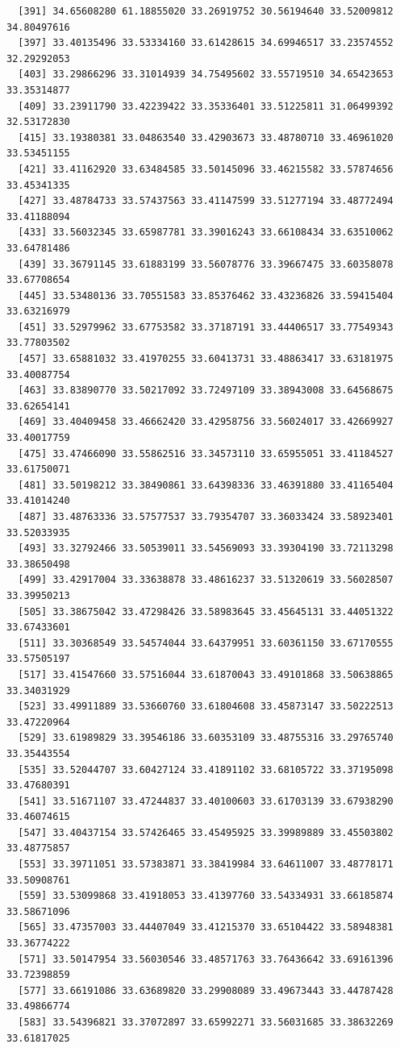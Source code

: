 \documentclass[
  letterpaper,
  DIV=11,
  numbers=noendperiod]{scrartcl}
\begin{document}
\begin{verbatim}
  [391] 34.65608280 61.18855020 33.26919752 30.56194640 33.52009812 34.80497616
  [397] 33.40135496 33.53334160 33.61428615 34.69946517 33.23574552 32.29292053
  [403] 33.29866296 33.31014939 34.75495602 33.55719510 34.65423653 33.35314877
  [409] 33.23911790 33.42239422 33.35336401 33.51225811 31.06499392 32.53172830
  [415] 33.19380381 33.04863540 33.42903673 33.48780710 33.46961020 33.53451155
  [421] 33.41162920 33.63484585 33.50145096 33.46215582 33.57874656 33.45341335
  [427] 33.48784733 33.57437563 33.41147599 33.51277194 33.48772494 33.41188094
  [433] 33.56032345 33.65987781 33.39016243 33.66108434 33.63510062 33.64781486
  [439] 33.36791145 33.61883199 33.56078776 33.39667475 33.60358078 33.67708654
  [445] 33.53480136 33.70551583 33.85376462 33.43236826 33.59415404 33.63216979
  [451] 33.52979962 33.67753582 33.37187191 33.44406517 33.77549343 33.77803502
  [457] 33.65881032 33.41970255 33.60413731 33.48863417 33.63181975 33.40087754
  [463] 33.83890770 33.50217092 33.72497109 33.38943008 33.64568675 33.62654141
  [469] 33.40409458 33.46662420 33.42958756 33.56024017 33.42669927 33.40017759
  [475] 33.47466090 33.55862516 33.34573110 33.65955051 33.41184527 33.61750071
  [481] 33.50198212 33.38490861 33.64398336 33.46391880 33.41165404 33.41014240
  [487] 33.48763336 33.57577537 33.79354707 33.36033424 33.58923401 33.52033935
  [493] 33.32792466 33.50539011 33.54569093 33.39304190 33.72113298 33.38650498
  [499] 33.42917004 33.33638878 33.48616237 33.51320619 33.56028507 33.39950213
  [505] 33.38675042 33.47298426 33.58983645 33.45645131 33.44051322 33.67433601
  [511] 33.30368549 33.54574044 33.64379951 33.60361150 33.67170555 33.57505197
  [517] 33.41547660 33.57516044 33.61870043 33.49101868 33.50638865 33.34031929
  [523] 33.49911889 33.53660760 33.61804608 33.45873147 33.50222513 33.47220964
  [529] 33.61989829 33.39546186 33.60353109 33.48755316 33.29765740 33.35443554
  [535] 33.52044707 33.60427124 33.41891102 33.68105722 33.37195098 33.47680391
  [541] 33.51671107 33.47244837 33.40100603 33.61703139 33.67938290 33.46074615
  [547] 33.40437154 33.57426465 33.45495925 33.39989889 33.45503802 33.48775857
  [553] 33.39711051 33.57383871 33.38419984 33.64611007 33.48778171 33.50908761
  [559] 33.53099868 33.41918053 33.41397760 33.54334931 33.66185874 33.58671096
  [565] 33.47357003 33.44407049 33.41215370 33.65104422 33.58948381 33.36774222
  [571] 33.50147954 33.56030546 33.48571763 33.76436642 33.69161396 33.72398859
  [577] 33.66191086 33.63689820 33.29908089 33.49673443 33.44787428 33.49866774
  [583] 33.54396821 33.37072897 33.65992271 33.56031685 33.38632269 33.61817025

\end{verbatim}
\end{document}
